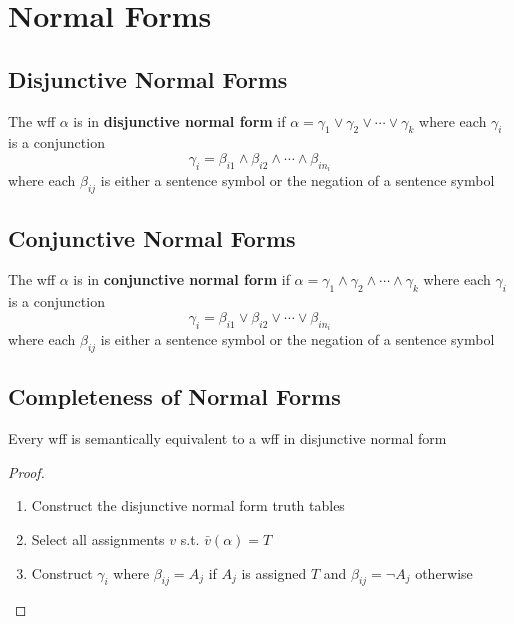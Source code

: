 \section{Normal Forms}
\label{sec:NormalForms}

\subsection{Disjunctive Normal Forms}
\label{sub:DisjunctiveNormalForms}

\begin{definition}
    \label{def:DisjunctiveNormalForm}
    The wff $\alpha$ is in \textbf{disjunctive normal form} if $\alpha=\gamma_1\vee\gamma_2\vee\cdots\vee\gamma_k$ where each $\gamma_i$ is a conjunction
    \[ \gamma_i = \beta_{i1}\wedge\beta_{i2}\wedge\cdots\wedge\beta_{in_i} \]
    where each $\beta_{ij}$ is either a sentence symbol or the negation of a sentence symbol
\end{definition}

\subsection{Conjunctive Normal Forms}
\label{sub:ConjunctiveNormalForms}

\begin{definition}
    \label{def:ConjunctiveNormalForm}
    The wff $\alpha$ is in \textbf{conjunctive normal form} if $\alpha=\gamma_1\wedge\gamma_2\wedge\cdots\wedge\gamma_k$ where each $\gamma_i$ is a conjunction
    \[ \gamma_i = \beta_{i1}\vee\beta_{i2}\vee\cdots\vee\beta_{in_i} \]
    where each $\beta_{ij}$ is either a sentence symbol or the negation of a sentence symbol
\end{definition}

\subsection{Completeness of Normal Forms}

\begin{theorem}
    \label{thm:CompletenessOfDNF}
    Every wff is semantically equivalent to a wff in disjunctive normal form
\end{theorem}
\begin{proof}
    \begin{enumerate}
        \item Construct the disjunctive normal form truth tables
        \item Select all assignments $v$ s.t. $\bar{v}(\alpha)=T$
        \item Construct $\gamma_i$ where $\beta_{ij} = A_j$ if $A_j$ is assigned $T$ and $\beta_{ij} = \neg A_j$ otherwise
    \end{enumerate}
\end{proof}

